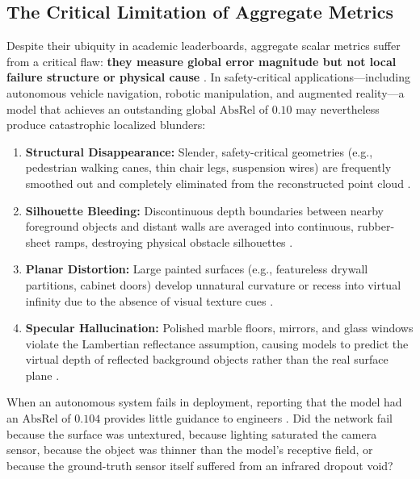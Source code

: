 \documentclass[11pt,a4paper]{article}
\begin{document}
\subsection{The Critical Limitation of Aggregate Metrics}
Despite their ubiquity in academic leaderboards, aggregate scalar metrics suffer from a critical flaw: \textbf{they measure global error magnitude but not local failure structure or physical cause} \citep{chawla2021error,singla2021understanding}. In safety-critical applications—including autonomous vehicle navigation, robotic manipulation, and augmented reality—a model that achieves an outstanding global $\text{AbsRel}$ of $0.10$ may nevertheless produce catastrophic localized blunders:
\begin{enumerate}
    \item \textbf{Structural Disappearance:} Slender, safety-critical geometries (e.g., pedestrian walking canes, thin chair legs, suspension wires) are frequently smoothed out and completely eliminated from the reconstructed point cloud \citep{kong2023robodepth}.
    \item \textbf{Silhouette Bleeding:} Discontinuous depth boundaries between nearby foreground objects and distant walls are averaged into continuous, rubber-sheet ramps, destroying physical obstacle silhouettes \citep{ranftl2021vision}.
    \item \textbf{Planar Distortion:} Large painted surfaces (e.g., featureless drywall partitions, cabinet doors) develop unnatural curvature or recess into virtual infinity due to the absence of visual texture cues \citep{yang2024depthanythingv2}.
    \item \textbf{Specular Hallucination:} Polished marble floors, mirrors, and glass windows violate the Lambertian reflectance assumption, causing models to predict the virtual depth of reflected background objects rather than the real surface plane \citep{roberts2021hypersim}.
\end{enumerate}

When an autonomous system fails in deployment, reporting that the model had an $\text{AbsRel}$ of $0.104$ provides little guidance to engineers \citep{zhang2019manifold,spinner2024innspector}. Did the network fail because the surface was untextured, because lighting saturated the camera sensor, because the object was thinner than the model's receptive field, or because the ground-truth sensor itself suffered from an infrared dropout void?
\end{document}
